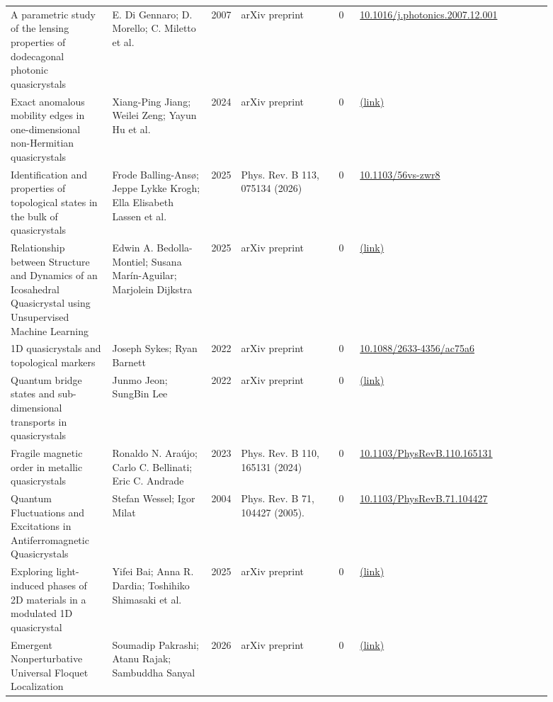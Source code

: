 \documentclass[10pt,a4paper]{article}
\begin{document}
{\begin{longtable}{p{0.192\linewidth}p{0.192\linewidth}p{0.043\linewidth}p{0.192\linewidth}p{0.043\linewidth}p{0.132\linewidth}p{0.096\linewidth}}
A parametric study of the lensing properties of dodecagonal photonic quasicrystals & E. Di Gennaro; D. Morello; C. Miletto et al. & 2007 & arXiv preprint & 0 & \href{https://doi.org/10.1016/j.photonics.2007.12.001}{10.1016/j.photonics.2007.12.001} &  \\
Exact anomalous mobility edges in one-dimensional non-Hermitian quasicrystals & Xiang-Ping Jiang; Weilei Zeng; Yayun Hu et al. & 2024 & arXiv preprint & 0 & \href{http://arxiv.org/abs/2409.03591v1}{(link)} &  \\
Identification and properties of topological states in the bulk of quasicrystals & Frode Balling-Ansø; Jeppe Lykke Krogh; Ella Elisabeth Lassen et al. & 2025 & Phys. Rev. B 113, 075134 (2026) & 0 & \href{https://doi.org/10.1103/56vs-zwr8}{10.1103/56vs-zwr8} &  \\
Relationship between Structure and Dynamics of an Icosahedral Quasicrystal using Unsupervised Machine Learning & Edwin A. Bedolla-Montiel; Susana Marín-Aguilar; Marjolein Dijkstra & 2025 & arXiv preprint & 0 & \href{http://arxiv.org/abs/2507.15731v1}{(link)} &  \\
1D quasicrystals and topological markers & Joseph Sykes; Ryan Barnett & 2022 & arXiv preprint & 0 & \href{https://doi.org/10.1088/2633-4356/ac75a6}{10.1088/2633-4356/ac75a6} &  \\
Quantum bridge states and sub-dimensional transports in quasicrystals & Junmo Jeon; SungBin Lee & 2022 & arXiv preprint & 0 & \href{http://arxiv.org/abs/2205.15343v1}{(link)} &  \\
Fragile magnetic order in metallic quasicrystals & Ronaldo N. Araújo; Carlo C. Bellinati; Eric C. Andrade & 2023 & Phys. Rev. B 110, 165131 (2024) & 0 & \href{https://doi.org/10.1103/PhysRevB.110.165131}{10.1103/PhysRevB.110.165131} &  \\
Quantum Fluctuations and Excitations in Antiferromagnetic Quasicrystals & Stefan Wessel; Igor Milat & 2004 & Phys. Rev. B 71, 104427 (2005). & 0 & \href{https://doi.org/10.1103/PhysRevB.71.104427}{10.1103/PhysRevB.71.104427} &  \\
Exploring light-induced phases of 2D materials in a modulated 1D quasicrystal & Yifei Bai; Anna R. Dardia; Toshihiko Shimasaki et al. & 2025 & arXiv preprint & 0 & \href{http://arxiv.org/abs/2506.11984v3}{(link)} &  \\
Emergent Nonperturbative Universal Floquet Localization & Soumadip Pakrashi; Atanu Rajak; Sambuddha Sanyal & 2026 & arXiv preprint & 0 & \href{http://arxiv.org/abs/2601.09793v1}{(link)} &  \\

\end{longtable}}
\end{document}
